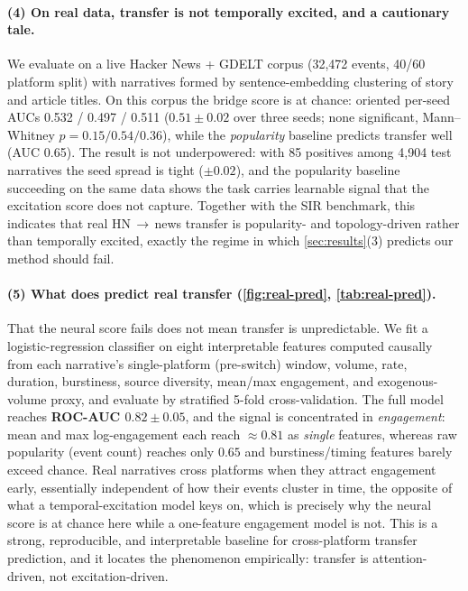 \documentclass[11pt]{article}
\begin{document}
\paragraph{(4) On real data, transfer is not temporally excited, and a
cautionary tale.} We evaluate on a live Hacker News + GDELT corpus (32{,}472
events, 40/60 platform split) with narratives formed by sentence-embedding
clustering of story and article titles. On this corpus the bridge score is at
chance: oriented per-seed AUCs 0.532 / 0.497 / 0.511 (\textbf{$0.51 \pm 0.02$}
over three seeds; none significant, Mann--Whitney $p = 0.15/0.54/0.36$), while
the \emph{popularity} baseline predicts transfer well (AUC 0.65). The result is
not underpowered: with 85 positives among 4{,}904 test narratives the seed
spread is tight ($\pm 0.02$), and the popularity baseline succeeding on the same
data shows the task carries learnable signal that the excitation score does not
capture. Together with the SIR benchmark, this indicates that real HN\,$\to$\,news
transfer is popularity- and topology-driven rather than temporally excited,
exactly the regime in which \cref{sec:results}(3) predicts our method should
fail.

\paragraph{(5) What does predict real transfer
(\cref{fig:real-pred}, \cref{tab:real-pred}).} That the neural score fails does
not mean transfer is unpredictable. We fit a logistic-regression classifier on
eight interpretable features computed causally from each narrative's
single-platform (pre-switch) window, volume, rate, duration, burstiness,
source diversity, mean/max engagement, and exogenous-volume proxy, and
evaluate by stratified 5-fold cross-validation. The full model reaches
\textbf{ROC-AUC $0.82 \pm 0.05$}, and the signal is concentrated in
\emph{engagement}: mean and max log-engagement each reach $\approx 0.81$ as
\emph{single} features, whereas raw popularity (event count) reaches only
$0.65$ and burstiness/timing features barely exceed chance. Real narratives
cross platforms when they attract engagement early, essentially independent of
how their events cluster in time, the opposite of what a temporal-excitation
model keys on, which is precisely why the neural score is at chance here while a
one-feature engagement model is not. This is a strong, reproducible, and
interpretable baseline for cross-platform transfer prediction, and it locates
the phenomenon empirically: transfer is attention-driven, not
excitation-driven.
\end{document}
